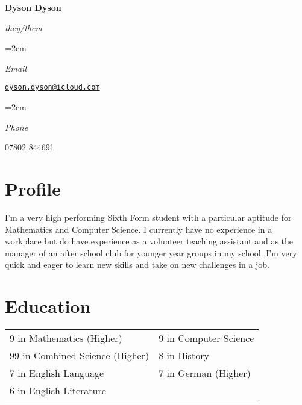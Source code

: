 \documentclass[a4paper, 12pt]{article}
\newlength{\spacebox}
\newcommand{\sepspace}{\vspace*{1em}}
\newcommand{\name}[1]{
	\Huge
	\begin{center}\textbf{#1}\end{center}\par
	\normalsize}
\newcommand{\pronouns}[1]{
	\normalsize
	\begin{center}\textsl{#1}\end{center}\par}
\newcommand{\info}[2]{
	\noindent\hangindent=2em\hangafter=0
	\parbox{\spacebox}{%
		\textsl{#1}}
	#2\par}
\begin{document}
\name{Dyson Dyson}
\vspace*{-1.5em}
\pronouns{they/them}

\sepspace

\info{Email}{\href{mailto:dyson.dyson@icloud.com}{\texttt{dyson.dyson@icloud.com}}}
\info{Phone}{07802 844691}

\section*{Profile}
I'm a very high performing Sixth Form student with a particular aptitude for Mathematics and Computer Science. I currently have no experience in a workplace but do have experience as a volunteer teaching assistant and as the manager of an after school club for younger year groups in my school. I'm very quick and eager to learn new skills and take on new challenges in a job.


\section*{Education}

\begin{center}
\end{center}

\begin{center}
	\begin{tabular}{m{16em} m{10em}}
		9 in Mathematics (Higher) & 9 in Computer Science \\
		99 in Combined Science (Higher) & 8 in History \\
		7 in English Language & 7 in German (Higher) \\
		6 in English Literature
	\end{tabular}
\end{center}
\end{document}
